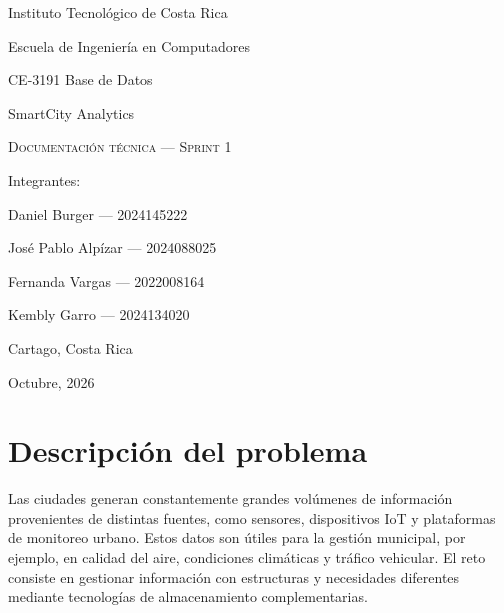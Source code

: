 \documentclass[12pt,letterpaper]{article}
\begin{document}
\hypersetup{pageanchor=false}
\begin{titlepage}
    \centering
    \vspace*{1.8cm}
    {\large Instituto Tecnológico de Costa Rica\par}
    \vspace{0.8cm}
    {\large Escuela de Ingeniería en Computadores\par}
    \vspace{0.8cm}
    {\large CE-3191 Base de Datos\par}
    \vspace{1.8cm}
    {\large SmartCity Analytics\par}
    \vspace{0.5cm}
    {\Large\scshape Documentación técnica --- Sprint 1\par}
    \vspace{1.8cm}
    {\large Integrantes:\par}
    \vspace{0.5cm}
    {\large Daniel Burger --- 2024145222\par}
    \vspace{0.2cm}
    {\large José Pablo Alpízar --- 2024088025\par}
    \vspace{0.2cm}
    {\large Fernanda Vargas --- 2022008164\par}
    \vspace{0.2cm}
    {\large Kembly Garro --- 2024134020\par}
    \vfill
    {\large Cartago, Costa Rica\par}
    \vspace{0.2cm}
    {\large Octubre, 2026\par}
\end{titlepage}
\hypersetup{pageanchor=true}

\section{Descripción del problema}

Las ciudades generan constantemente grandes volúmenes de información provenientes
de distintas fuentes, como sensores, dispositivos IoT y plataformas de monitoreo
urbano. Estos datos son útiles para la gestión municipal, por ejemplo, en calidad
del aire, condiciones climáticas y tráfico vehicular. El reto consiste en gestionar
información con estructuras y necesidades diferentes mediante tecnologías de
almacenamiento complementarias.
\end{document}

